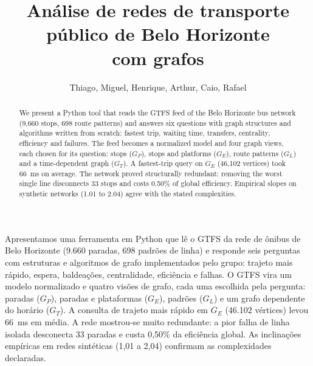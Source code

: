 \documentclass[12pt]{article}
\title{Análise de redes de transporte público de Belo Horizonte\\com grafos}
\author{Thiago\inst{1}, Miguel\inst{1}, Henrique\inst{1}, Arthur\inst{1}, Caio\inst{1}, Rafael\inst{1}}
\begin{document}
\maketitle

\begin{abstract}
  We present a Python tool that reads the GTFS feed of the Belo Horizonte bus network
  (9,660 stops, 698 route patterns) and answers six questions with graph structures and
  algorithms written from scratch: fastest trip, waiting time, transfers, centrality,
  efficiency and failures. The feed becomes a normalized model and four graph views, each
  chosen for its question: stops ($G_P$), stops and platforms ($G_E$), route patterns
  ($G_L$) and a time-dependent graph ($G_T$). A fastest-trip query on $G_E$ (46,102
  vertices) took 66~ms on average. The network proved structurally redundant: removing
  the worst single line disconnects 33 stops and costs 0.50\% of global efficiency.
  Empirical slopes on synthetic networks (1.01 to 2.04) agree with the stated complexities.
\end{abstract}

\begin{resumo}
  Apresentamos uma ferramenta em Python que lê o GTFS da rede de ônibus de Belo Horizonte
  (9.660 paradas, 698 padrões de linha) e responde seis perguntas com estruturas e
  algoritmos de grafo implementados pelo grupo: trajeto mais rápido, espera, baldeações,
  centralidade, eficiência e falhas. O GTFS vira um modelo normalizado e quatro visões de
  grafo, cada uma escolhida pela pergunta: paradas ($G_P$), paradas e plataformas ($G_E$),
  padrões ($G_L$) e um grafo dependente do horário ($G_T$). A consulta de trajeto mais
  rápido em $G_E$ (46.102 vértices) levou 66~ms em média. A rede mostrou-se muito
  redundante: a pior falha de linha isolada desconecta 33 paradas e custa 0,50\% da
  eficiência global. As inclinações empíricas em redes sintéticas (1,01 a 2,04) confirmam
  as complexidades declaradas.
\end{resumo}














\end{document}
